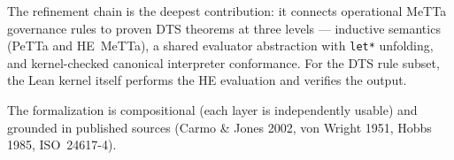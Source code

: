 \documentclass[]{article}
\newcommand{\code}[1]{\texttt{#1}}
\newcommand{\DTS}{\textup{DTS}}
\begin{document}
The refinement chain is the deepest contribution: it connects
operational MeTTa governance rules to proven \DTS{} theorems at three
levels --- inductive semantics (PeTTa and HE~MeTTa), a shared evaluator
abstraction with \code{let*} unfolding, and kernel-checked canonical
interpreter conformance.  For the DTS rule subset, the Lean kernel
itself performs the HE evaluation and verifies the output.

The formalization is compositional (each layer is independently usable)
and grounded in published sources (Carmo \& Jones 2002, von Wright 1951,
Hobbs 1985, ISO~24617-4).



\end{document}
